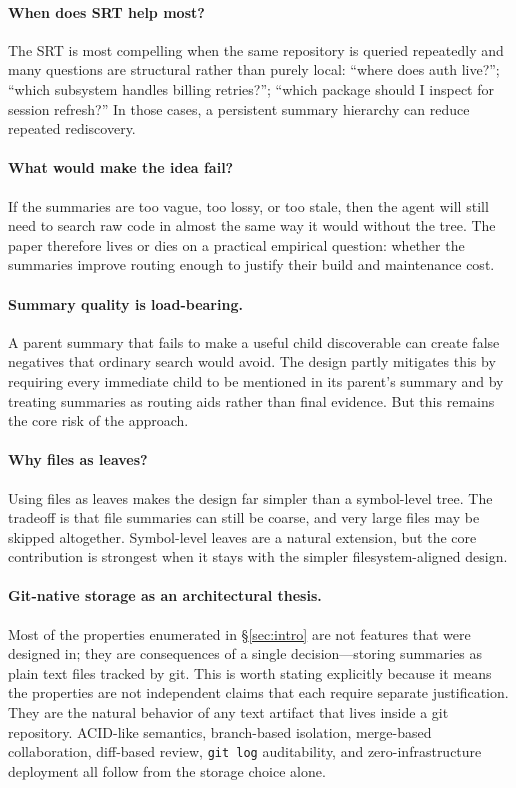 \documentclass[11pt,a4paper]{article}
\newcommand{\srt}{\textsc{SRT}}
\begin{document}
\paragraph{When does \srt{} help most?}
The \srt{} is most compelling when the same repository is queried repeatedly and many questions are structural rather than purely local: ``where does auth live?''; ``which subsystem handles billing retries?''; ``which package should I inspect for session refresh?'' In those cases, a persistent summary hierarchy can reduce repeated rediscovery.

\paragraph{What would make the idea fail?}
If the summaries are too vague, too lossy, or too stale, then the agent will still need to search raw code in almost the same way it would without the tree. The paper therefore lives or dies on a practical empirical question: whether the summaries improve routing enough to justify their build and maintenance cost.

\paragraph{Summary quality is load-bearing.}
A parent summary that fails to make a useful child discoverable can create false negatives that ordinary search would avoid. The design partly mitigates this by requiring every immediate child to be mentioned in its parent's summary and by treating summaries as routing aids rather than final evidence. But this remains the core risk of the approach.

\paragraph{Why files as leaves?}
Using files as leaves makes the design far simpler than a symbol-level tree. The tradeoff is that file summaries can still be coarse, and very large files may be skipped altogether. Symbol-level leaves are a natural extension, but the core contribution is strongest when it stays with the simpler filesystem-aligned design.

\paragraph{Git-native storage as an architectural thesis.}
Most of the properties enumerated in \S\ref{sec:intro} are not features that were designed in; they are consequences of a single decision---storing summaries as plain text files tracked by git.
This is worth stating explicitly because it means the properties are not independent claims that each require separate justification.
They are the natural behavior of any text artifact that lives inside a git repository.
ACID-like semantics, branch-based isolation, merge-based collaboration, diff-based review, \texttt{git log} auditability, and zero-infrastructure deployment all follow from the storage choice alone.
\end{document}
